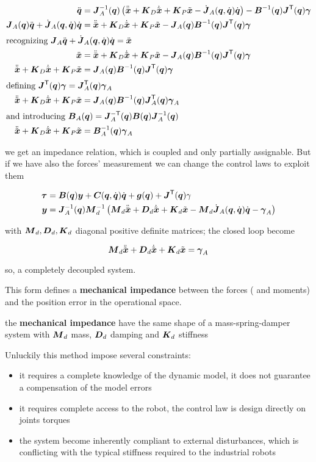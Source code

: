 \begin{align*}
	\ddq &= \J_A^\inv(\q) \left( \ddxd + \K_D\dxe + \K_P \xe - \dJ_A(\q,\dq)\dq \right) - \B^\inv(\q)\J^\trans(\q)\vect\gamma \\
	\J_A(\q)\ddq + \dJ_A(\q,\dq)\dq &= \ddxd + \K_D\dxe + \K_P \xe - \J_A(\q)\B^\inv(\q)\J^\trans(\q)\vect\gamma \\
	\intertext{recognizing $\J_A\ddq + \dJ_A(\q,\dq)\dq = \ddx$}
	\ddx &= \ddxd + \K_D\dxe + \K_P \xe - \J_A(\q)\B^\inv(\q)\J^\trans(\q)\vect\gamma \\
	\ddxe + \K_D\dxe + \K_P \xe &= \J_A(\q)\B^\inv(\q)\J^\trans(\q)\vect\gamma \\
	\intertext{defining $\J^\trans(\q)\vect\gamma = \J_A^\trans(\q)\vect\gamma_A$}
	\ddxe + \K_D\dxe + \K_P \xe &= \J_A(\q)\B^\inv(\q)\J_A^\trans(\q)\vect\gamma_A \\
	\intertext{and introducing $\B_A(\q) = \J_A^{-\trans}(\q)\B(\q)\J_A^\inv(\q)$}
	\ddxe + \K_D\dxe + \K_P \xe &= \B_A^\inv(\q)\vect\gamma_A
\end{align*}

we get an impedance relation, which is coupled and only partially assignable.
But if we have also the forces' measurement we can change the control laws to exploit them

\begin{align*}
    \vect\tau &= \B(\q)\y + \C(\q,\dq)\dq + \g(\q) + \J^\trans(\q)\gamma \\
    \y &= \J_A^\inv(\q) \matr M_d^\inv \left( \matr M_d \ddxd + \matr D_d\dxe + \K_d \xe - \matr M_d \dJ_A(\q,\dq)\dq - \vect\gamma_A \right)
\end{align*}

with $\matr M_d, \matr D_d, \K_d$ diagonal positive definite matrices;
the closed loop become

\[
	\matr M_d \ddxe + \matr D_d \dxe + \K_d \xe = \vect\gamma_A
\]

so, a completely decoupled system.

This form defines a \textbf{mechanical impedance} between the forces ( and moments) and the position error in the operational space.

\begin{nb}the \textbf{mechanical impedance} have the same shape of a mass-spring-damper system  with $\matr M_d$ mass, $\matr D_d$ damping and $\K_d$ stiffness\end{nb}

Unluckily this method impose several constraints:

\begin{itemize}
	\item it requires a complete knowledge of the dynamic model, it does not guarantee a compensation of the model errors
	\item it requires complete access to the robot, the control law is design directly on joints torques
	\item the system become inherently compliant to external disturbances, which is conflicting with the typical stiffness required to the industrial robots
\end{itemize}

